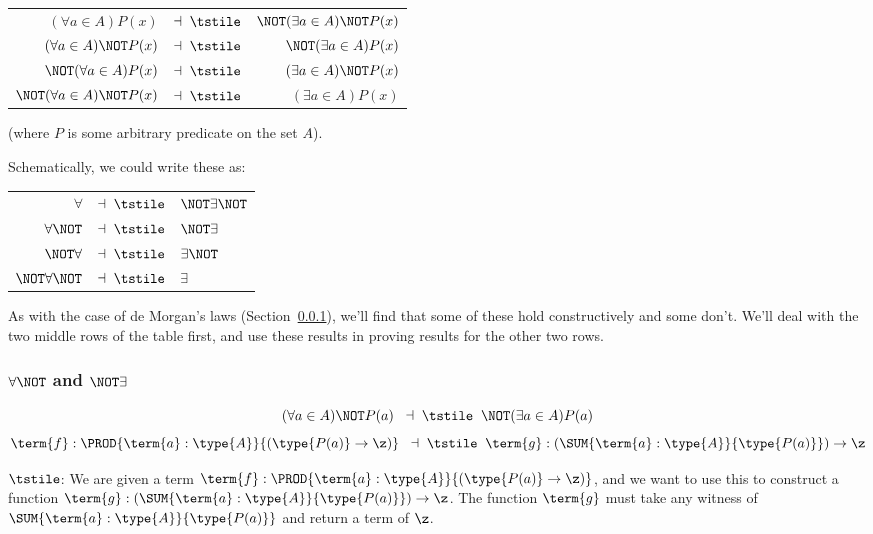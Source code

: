 \begin{table}[h]
\centering
\begin{tabular}{r c r }
$(\forall a \in A) P(x)$					&$\dashv \; \tstile$ 	
&$\NOT (\exists a \in A) \NOT P(x)$
 \\
$(\forall a \in A) \NOT P(x)$					&$\dashv \; \tstile$ 	
&$\NOT (\exists a \in A) P(x)$
 \\
$\NOT(\forall a \in A) P(x)$					&$\dashv \; \tstile$ 	
&$(\exists a \in A) \NOT P(x)$
 \\
$\NOT(\forall a \in A) \NOT P(x)$					&$\dashv \; \tstile$ 	
&$(\exists a \in A) P(x)$
\end{tabular}
\end{table}
(where $P$ is some arbitrary predicate on the set $A$).

Schematically, we could write these as:

\begin{table}[h]
\centering
\begin{tabular}{r c l}
$\forall$					&$\dashv \; \tstile$ 	
&$\NOT \exists\NOT $
 \\
$\forall\NOT $					&$\dashv \; \tstile$ 	
&$\NOT \exists$
 \\
$\NOT\forall$					&$\dashv \; \tstile$ 	
&$\exists\NOT $
 \\
$\NOT\forall\NOT $					&$\dashv \; \tstile$ 	
&$\exists$
\end{tabular}
\end{table}

As with the case of de Morgan's laws (Section~\ref{}), we'll find that some of these hold constructively and some don't.  We'll deal with the two middle rows of the table first, and use these results in proving results for the other two rows.




\subsubsection{$\forall\NOT$ and $\NOT \exists$}

\[
(\forall a \in A) \NOT P(a)
\;\; \dashv \; \tstile 	\;\; 
\NOT (\exists a \in A) P(a)
\]
\[
\term{f}:\PROD
{\term{a}:\type{A}}
{(\type{P(a)} \to \z)}
\;\; \dashv \; \tstile 	\;\; 
\term{g}:\left(
\SUM{\term{a}:\type{A}}{\type{P(a)}}
\right) \to \z
\]

$\tstile$:  We are given a term 
$\term{f}:\PROD
{\term{a}:\type{A}}
{(\type{P(a)} \to \z)}$, 
and we want to use this to construct a function 
$\term{g}: \left(
\SUM{\term{a}:\type{A}}{\type{P(a)}}
\right) \to \z$.  
The function $\term{g}$ must take any witness of 
$\SUM{\term{a}:\type{A}}{\type{P(a)}}$
and return a term of $\z$.  

